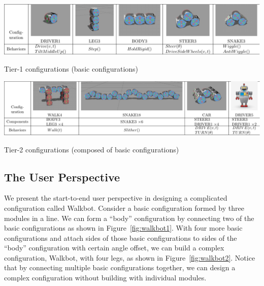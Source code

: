 \documentclass[conference]{IEEEtran}
\theoremstyle{definition}
\begin{document}
\begin{table}
    \begin{center}
        \includegraphics[width=\textwidth]{images/library/tier1.pdf}
        \caption{Tier-1 configurations (basic configurations)}
        \label{Order-1-configurations}
    \end{center}
\end{table}
\begin{table}
    \begin{center}
        \includegraphics[width=\textwidth]{images/library/tier2.pdf}
        \caption{Tier-2 configurations (composed of basic configurations)}
        \label{Order-2-configurations}
    \end{center}
\end{table}

\subsection{The User Perspective}
We present the start-to-end user perspective in designing a complicated configuration called Walkbot. Consider a basic configuration formed by three modules in a line. We can form a ``body'' configuration by connecting two of the basic configurations as shown in Figure~\ref{fig:walkbot1}. With four more basic configurations and attach sides of those basic configurations to sides of the ``body'' configuration with certain angle offset, we can build a complex configuration, Walkbot, with four legs, as shown in Figure~\ref{fig:walkbot2}. Notice that by connecting multiple  basic configurations together, we can design a complex configuration without building with individual modules.
\end{document}
